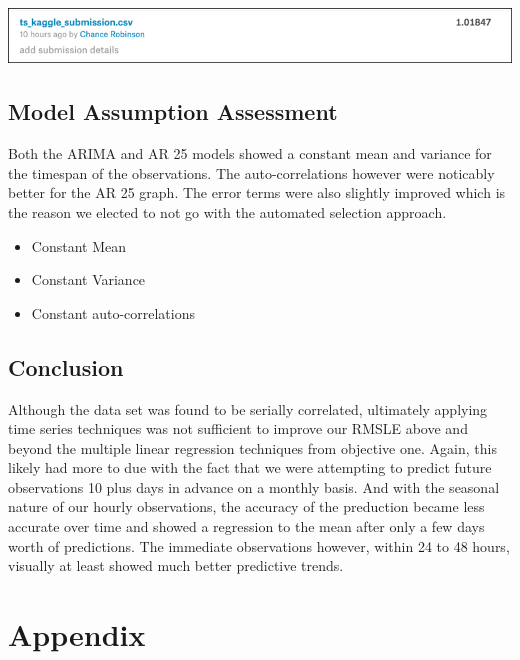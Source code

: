 \documentclass[american,]{article}
\providecommand{\tightlist}{%
  \setlength{\itemsep}{0pt}\setlength{\parskip}{0pt}}
\begin{document}
\label{objective-two:ar25-kaggle}

\begin{center}\includegraphics[width=0.9\linewidth]{./images/time_series_ar25} \end{center}

\hypertarget{model-assumption-assessment}{%
\subsection{Model Assumption Assessment}\label{model-assumption-assessment}}

Both the ARIMA and AR 25 models showed a constant mean and variance for the timespan of the observations. The auto-correlations however were noticably better for the AR 25 graph. The error terms were also slightly improved which is the reason we elected to not go with the automated selection approach.

\begin{itemize}
\tightlist
\item
  Constant Mean
\item
  Constant Variance
\item
  Constant auto-correlations
\end{itemize}

\hypertarget{conclusion-1}{%
\subsection{Conclusion}\label{conclusion-1}}

Although the data set was found to be serially correlated, ultimately applying time series techniques was not sufficient to improve our RMSLE above and beyond the multiple linear regression techniques from objective one. Again, this likely had more to due with the fact that we were attempting to predict future observations 10 plus days in advance on a monthly basis. And with the seasonal nature of our hourly observations, the accuracy of the preduction became less accurate over time and showed a regression to the mean after only a few days worth of predictions. The immediate observations however, within 24 to 48 hours, visually at least showed much better predictive trends.

\newpage

\hypertarget{appendix}{%
\section{Appendix}\label{appendix}}
\end{document}
